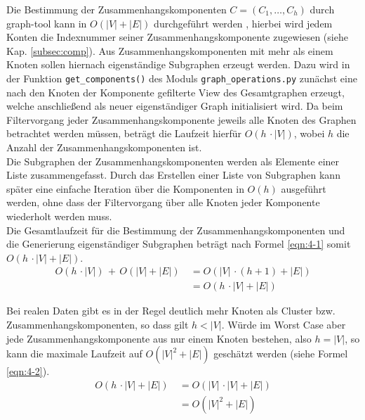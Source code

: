 Die Bestimmung der Zusammenhangskomponenten $C = (C_{1}, \dots , C_{h})$ durch graph-tool kann in $ O(|V| + |E|) $ durchgeführt werden \cite{docs_graph_tool}, hierbei wird jedem Konten die Indexnummer seiner Zusammenhangskomponente zugewiesen (siehe Kap. \ref{subsec:comp}). Aus Zusammenhangskomponenten mit mehr als einem Knoten sollen hiernach eigenständige Subgraphen erzeugt werden. Dazu wird in der Funktion \lstinline|get_components()| des Moduls \lstinline|graph_operations.py| zunächst eine nach den Knoten der Komponente gefilterte View des Gesamtgraphen erzeugt, welche anschließend als neuer eigenständiger Graph initialisiert wird. Da beim Filtervorgang jeder Zusammenhangskomponente jeweils alle Knoten des Graphen betrachtet werden müssen, beträgt die Laufzeit hierfür $ O(h \, \cdotp |V|) $, wobei $h$ die Anzahl der Zusammenhangskomponenten ist. \\

Die Subgraphen der Zusammenhangskomponenten werden als Elemente einer Liste zusammengefasst. Durch das Erstellen einer Liste von Subgraphen kann später eine einfache Iteration über die Komponenten in $ O(h) $ ausgeführt werden, ohne dass der Filtervorgang über alle Knoten jeder Komponente wiederholt werden muss. \\

Die Gesamtlaufzeit für die Bestimmung der Zusammenhangskomponenten und die Generierung eigenständiger Subgraphen beträgt nach Formel \eqref{eqn:4-1} somit $ O(h \, \cdotp |V| + |E|) $. 
\begin{equation} \label{eqn:4-1}
\tag{4-1}
\begin{aligned}
 O(h \, \cdotp |V|) \, + \, O(|V| + |E|) &\ {} = O(|V| \, \cdotp (h + 1) +|E|)\\
 &\ = O(h \, \cdotp |V| + |E|)
 \end{aligned}
\end{equation}

Bei realen Daten gibt es in der Regel deutlich mehr Knoten als Cluster bzw. Zusammenhangskomponenten, so dass gilt $ h < |V| $. Würde im Worst Case aber jede Zusammenhangskomponente aus nur einem Knoten bestehen, also $ h = |V| $, so kann die maximale Laufzeit auf $ O(|V|^2 + |E|) $ geschätzt werden (siehe Formel \eqref{eqn:4-2}).\\
\begin{equation} \label{eqn:4-2}
\tag{4-2}
\begin{aligned}
O(h \, \cdotp |V| + |E|) &\ {} = O(|V| \, \cdotp |V| + |E|)\\
&\ = O(|V|^2 + |E|) 
\end{aligned}
\end{equation}


